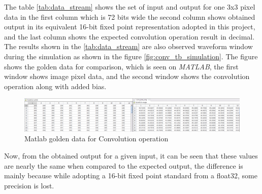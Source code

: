     \noindent The table \ref{tab:data_stream} shows the set of input and output for one 3x3 pixel data in the first column which is 72 bits wide the second column shows obtained output in its equivalent 16-bit fixed point representation adopted in this project, and the last column shows the expected convolution operation result in decimal. The results shown in the \ref{tab:data_stream} are also observed waveform window during the simulation as shown in the figure \ref{fig:conv_tb_simulation}. The figure shows the golden data for comparison, which is seen on \textit{MATLAB}, the first window shows image pixel data, and the second window shows the convolution operation along with added bias.

    \begin{figure}
        \centering
        \includegraphics[width=1\textwidth]{images/matlabGoldenData.png}
        \caption{Matlab golden data for Convolution operation}
        \label{fig:matlabGoldenData}
    \end{figure}
    
    \par
    \noindent Now, from the obtained output for a given input, it can be seen that these values are nearly the same when compared to the expected output, the difference is mainly because while adopting a 16-bit fixed point standard from a float32, some precision is lost.

